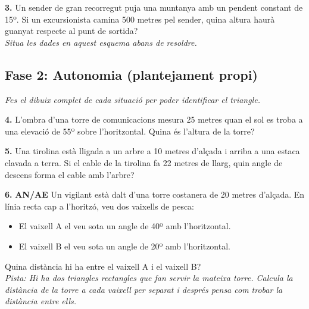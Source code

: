 \documentclass[12pt,a4paper]{article}
\begin{document}
\vspace{3cm}

\textbf{3.} Un sender de gran recorregut puja una muntanya amb un pendent constant de 15º. Si un excursionista camina 500 metres pel sender, quina altura haurà guanyat respecte al punt de sortida? \\
\textit{Situa les dades en aquest esquema abans de resoldre.}

\begin{minipage}{0.3\textwidth}
\vspace{0.5cm}
\end{minipage}
\begin{minipage}{0.65\textwidth}
\vspace{3.5cm}
\end{minipage}

\subsection*{Fase 2: Autonomia (plantejament propi)}
\textit{Fes el dibuix complet de cada situació per poder identificar el triangle.}

\vspace{0.5cm}

\textbf{4.} L'ombra d'una torre de comunicacions mesura 25 metres quan el sol es troba a una elevació de 55º sobre l'horitzontal. Quina és l'altura de la torre?

\vspace{4.5cm}


\textbf{5.} Una tirolina està lligada a un arbre a 10 metres d'alçada i arriba a una estaca clavada a terra. Si el cable de la tirolina fa 22 metres de llarg, quin angle de descens forma el cable amb l'arbre? 

\vspace{4.5cm}

\textbf{6.} \textbf{AN/AE} Un vigilant està dalt d'una torre costanera de 20 metres d'alçada. En línia recta cap a l'horitzó, veu dos vaixells de pesca:
\begin{itemize}
    \item El vaixell A el veu sota un angle de 40º amb l'horitzontal.
    \item El vaixell B el veu sota un angle de 20º amb l'horitzontal.
\end{itemize}
Quina distància hi ha entre el vaixell A i el vaixell B? \\
\textit{Pista: Hi ha dos triangles rectangles que fan servir la mateixa torre. Calcula la distància de la torre a cada vaixell per separat i després pensa com trobar la distància entre ells.}
\vspace{4.5cm}
\end{document}
